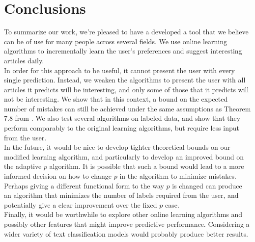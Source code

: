 \documentclass[12pt]{article}
\begin{document}
\section{Conclusions}
To summarize our work, we're pleased to have a developed a tool that we believe can be of use for many people across several fields. We use online learning algorithms to incrementally learn the user's preferences and suggest interesting articles daily.\\
\indent In order for this approach to be useful, it cannot present the user with every single prediction.  Instead, we weaken the algorithms to present the user with all articles it predicts will be interesting, and only some of those that it predicts will not be interesting.  We show that in this context, a bound on the expected number of mistakes can still be achieved under the same assumptions as Theorem 7.8 from \cite{FML}.  We also test several algorithms on labeled data, and show that they perform comparably to the original learning algorithms, but require less input from the user. \\
\indent In the future, it would be nice to develop tighter theoretical bounds on our modified learning algorithm, and particularly to develop an improved bound on the adaptive $p$ algorithm.  It is possible that such a bound would lead to a more informed decision on how to change $p$ in the algorithm to minimize mistakes. Perhaps giving a different functional form to the way $p$ is changed can produce an algorithm that minimizes the number of labels required from the user, and potentially give a clear improvement over the fixed $p$ case.\\
\indent Finally, it would be worthwhile to explore other online learning algorithms and possibly other features that might improve predictive performance. Considering a wider variety of text classification models would probably produce better results.
{}

\end{document}
